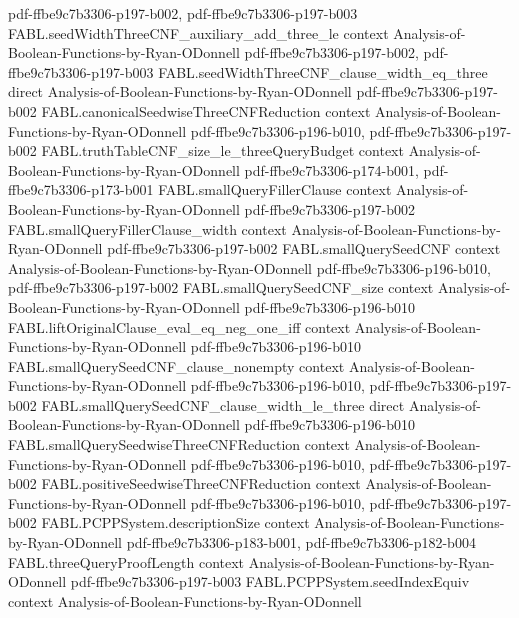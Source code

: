 \begin{theorem}
  {pdf-ffbe9c7b3306-p197-b002,
    pdf-ffbe9c7b3306-p197-b003}
\proofstep
  {FABL.seedWidthThreeCNF_auxiliary_add_three_le}
  {context}
  {Analysis-of-Boolean-Functions-by-Ryan-ODonnell}
  {pdf-ffbe9c7b3306-p197-b002,
    pdf-ffbe9c7b3306-p197-b003}
\proofstep
  {FABL.seedWidthThreeCNF_clause_width_eq_three}
  {direct}
  {Analysis-of-Boolean-Functions-by-Ryan-ODonnell}
  {pdf-ffbe9c7b3306-p197-b002}
\proofstep
  {FABL.canonicalSeedwiseThreeCNFReduction}
  {context}
  {Analysis-of-Boolean-Functions-by-Ryan-ODonnell}
  {pdf-ffbe9c7b3306-p196-b010,
    pdf-ffbe9c7b3306-p197-b002}
\proofstep
  {FABL.truthTableCNF_size_le_threeQueryBudget}
  {context}
  {Analysis-of-Boolean-Functions-by-Ryan-ODonnell}
  {pdf-ffbe9c7b3306-p174-b001,
    pdf-ffbe9c7b3306-p173-b001}
\proofstep
  {FABL.smallQueryFillerClause}
  {context}
  {Analysis-of-Boolean-Functions-by-Ryan-ODonnell}
  {pdf-ffbe9c7b3306-p197-b002}
\proofstep
  {FABL.smallQueryFillerClause_width}
  {context}
  {Analysis-of-Boolean-Functions-by-Ryan-ODonnell}
  {pdf-ffbe9c7b3306-p197-b002}
\proofstep
  {FABL.smallQuerySeedCNF}
  {context}
  {Analysis-of-Boolean-Functions-by-Ryan-ODonnell}
  {pdf-ffbe9c7b3306-p196-b010,
    pdf-ffbe9c7b3306-p197-b002}
\proofstep
  {FABL.smallQuerySeedCNF_size}
  {context}
  {Analysis-of-Boolean-Functions-by-Ryan-ODonnell}
  {pdf-ffbe9c7b3306-p196-b010}
\proofstep
  {FABL.liftOriginalClause_eval_eq_neg_one_iff}
  {context}
  {Analysis-of-Boolean-Functions-by-Ryan-ODonnell}
  {pdf-ffbe9c7b3306-p196-b010}
\proofstep
  {FABL.smallQuerySeedCNF_clause_nonempty}
  {context}
  {Analysis-of-Boolean-Functions-by-Ryan-ODonnell}
  {pdf-ffbe9c7b3306-p196-b010,
    pdf-ffbe9c7b3306-p197-b002}
\proofstep
  {FABL.smallQuerySeedCNF_clause_width_le_three}
  {direct}
  {Analysis-of-Boolean-Functions-by-Ryan-ODonnell}
  {pdf-ffbe9c7b3306-p196-b010}
\proofstep
  {FABL.smallQuerySeedwiseThreeCNFReduction}
  {context}
  {Analysis-of-Boolean-Functions-by-Ryan-ODonnell}
  {pdf-ffbe9c7b3306-p196-b010,
    pdf-ffbe9c7b3306-p197-b002}
\proofstep
  {FABL.positiveSeedwiseThreeCNFReduction}
  {context}
  {Analysis-of-Boolean-Functions-by-Ryan-ODonnell}
  {pdf-ffbe9c7b3306-p196-b010,
    pdf-ffbe9c7b3306-p197-b002}
\proofstep
  {FABL.PCPPSystem.descriptionSize}
  {context}
  {Analysis-of-Boolean-Functions-by-Ryan-ODonnell}
  {pdf-ffbe9c7b3306-p183-b001,
    pdf-ffbe9c7b3306-p182-b004}
\proofstep
  {FABL.threeQueryProofLength}
  {context}
  {Analysis-of-Boolean-Functions-by-Ryan-ODonnell}
  {pdf-ffbe9c7b3306-p197-b003}
\proofstep
  {FABL.PCPPSystem.seedIndexEquiv}
  {context}
  {Analysis-of-Boolean-Functions-by-Ryan-ODonnell}

\end{theorem}
